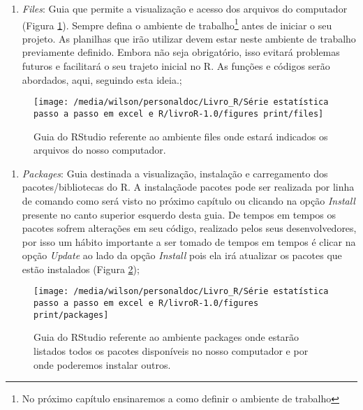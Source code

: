 \documentclass[14pt,titlepage, oneside, openany, a4paper]{book}
\providecommand{\tightlist}{%
  \setlength{\itemsep}{0pt}\setlength{\parskip}{0pt}}
\begin{document}
\begin{enumerate}
\def\labelenumi{\arabic{enumi}.}
\setcounter{enumi}{4}
\tightlist
\item
  \emph{Files}: Guia que permite a visualização e acesso dos arquivos do computador (Figura \ref{fig:files}). Sempre defina o ambiente de trabalho\footnote{No próximo capítulo ensinaremos a como definir o ambiente de trabalho} antes de iniciar o seu projeto. As planilhas que irão utilizar devem estar neste ambiente de trabalho previamente definido. Embora não seja obrigatório, isso evitará problemas futuros e facilitará o seu trajeto inicial no R. As funções e códigos serão abordados, aqui, seguindo esta ideia.;
\end{enumerate}

\begin{figure}[H]
\texttt{[image: /media/wilson/personaldoc/Livro\_R/Série estatística passo a passo em excel e R/livroR-1.0/figures print/files]} \caption{Guia do RStudio referente ao ambiente files onde estará indicados os arquivos do nosso computador.}\label{fig:files}
\end{figure}

\begin{enumerate}
\def\labelenumi{\arabic{enumi}.}
\setcounter{enumi}{5}
\tightlist
\item
  \emph{Packages}: Guia destinada a visualização, instalação e carregamento dos pacotes/bibliotecas do R. A instalaçãode pacotes pode ser realizada por linha de comando como será visto no próximo capítulo ou clicando na opção \emph{Install} presente no canto superior esquerdo desta guia. De tempos em tempos os pacotes sofrem alterações em seu código, realizado pelos seus desenvolvedores, por isso um hábito importante a ser tomado de tempos em tempos é clicar na opção \emph{Update} ao lado da opção \emph{Install} pois ela irá atualizar os pacotes que estão instalados (Figura \ref{fig:packages});
\end{enumerate}

\begin{figure}[H]
\texttt{[image: /media/wilson/personaldoc/Livro\_R/Série estatística passo a passo em excel e R/livroR-1.0/figures print/packages]} \caption{Guia do RStudio referente ao ambiente packages onde estarão listados todos os pacotes disponíveis no nosso computador e por onde poderemos instalar outros.}\label{fig:packages}
\end{figure}
\end{document}
